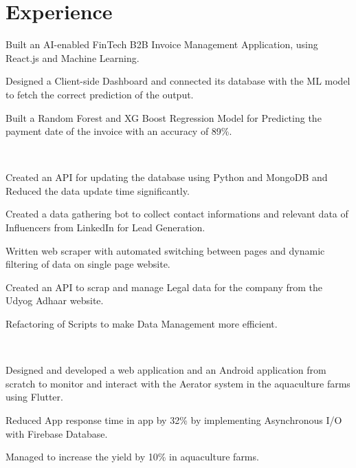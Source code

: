 \documentclass[]{deedy-resume-openfont}
\begin{document}
\begin{minipage}[t]{0.56\textwidth} 


\section{Experience}
\vspace{\topsep}
\begin{tightemize}
\item Built an AI-enabled FinTech B2B Invoice Management Application, using React.js and Machine Learning.
\item Designed a Client-side Dashboard and connected its database with the ML model to fetch the correct prediction of the output.
\item Built a Random Forest and XG Boost Regression Model for Predicting the payment date of the invoice with an accuracy of 89\%.
\end{tightemize}
\ \ \ \ \ \ 
\sectionsep

\begin{tightemize}
\item Created an API for updating the database using Python and MongoDB and Reduced the data update time significantly.
\item Created a data gathering bot to collect contact informations and relevant data of Influencers from LinkedIn for Lead Generation.
\item Written web scraper with automated switching between pages and dynamic filtering of data on single page website.
\item Created an API to scrap and manage Legal data for the company from the Udyog Adhaar website.
\item Refactoring of Scripts to make Data Management more efficient. \ \ \ \ \ \ \ \ 
\end{tightemize}
\ \ \ \ \ \ 
\sectionsep

\begin{tightemize}
\item Designed and developed a web application and an Android application from scratch to monitor and interact with the Aerator system in the aquaculture farms using Flutter.
\item Reduced App response time in app by 32\% by implementing Asynchronous I/O with Firebase Database.
\item Managed to increase the yield by 10\% in aquaculture farms.
\end{tightemize}
\ \ \ \ \ \ 


\end{minipage}
\end{document}
